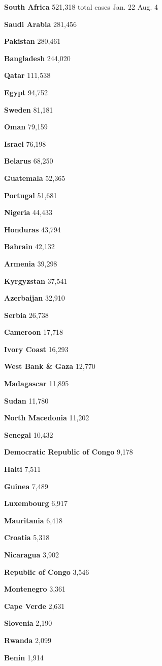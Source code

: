 \textbf{South Africa} 521,318 total cases Jan. 22 Aug. 4

\textbf{Saudi Arabia} 281,456

\textbf{Pakistan} 280,461

\textbf{Bangladesh} 244,020

\textbf{Qatar} 111,538

\textbf{Egypt} 94,752

\textbf{Sweden} 81,181

\textbf{Oman} 79,159

\textbf{Israel} 76,198

\textbf{Belarus} 68,250

\textbf{Guatemala} 52,365

\textbf{Portugal} 51,681

\textbf{Nigeria} 44,433

\textbf{Honduras} 43,794

\textbf{Bahrain} 42,132

\textbf{Armenia} 39,298

\textbf{Kyrgyzstan} 37,541

\textbf{Azerbaijan} 32,910

\textbf{Serbia} 26,738

\textbf{Cameroon} 17,718

\textbf{Ivory Coast} 16,293

\textbf{West Bank \& Gaza} 12,770

\textbf{Madagascar} 11,895

\textbf{Sudan} 11,780

\textbf{North Macedonia} 11,202

\textbf{Senegal} 10,432

\textbf{Democratic Republic of Congo} 9,178

\textbf{Haiti} 7,511

\textbf{Guinea} 7,489

\textbf{Luxembourg} 6,917

\textbf{Mauritania} 6,418

\textbf{Croatia} 5,318

\textbf{Nicaragua} 3,902

\textbf{Republic of Congo} 3,546

\textbf{Montenegro} 3,361

\textbf{Cape Verde} 2,631

\textbf{Slovenia} 2,190

\textbf{Rwanda} 2,099

\textbf{Benin} 1,914

